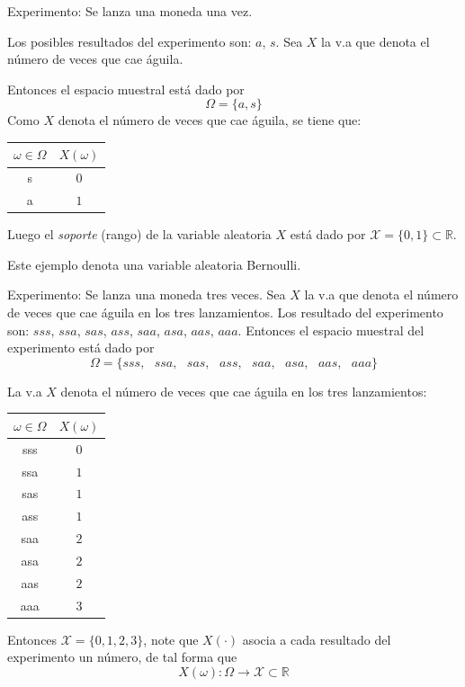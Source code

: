 \begin{example}
Experimento: Se lanza una moneda una vez. 
\vspace{5mm}

Los posibles resultados del experimento son: $a$, $s$. Sea $X$ la v.a que denota el número de veces que cae águila.

Entonces el espacio muestral está dado por
\begin{equation*}
\Omega =\{a,s\}
\end{equation*}
Como $X$ denota el número de veces que cae águila, se tiene que:
\begin{center}
\begin{tabular}{cc}
\hline
$\omega \in \Omega $ & $X(\omega )$ \\ 
\hline
s & $0$ \\ 
a & $1$ \\
\hline
\end{tabular}
\end{center}
Luego el \textit{soporte} (rango) de la variable aleatoria $X$ está dado por $\mathcal{X}=\{0,1\}\subset \mathbb{R}$.
\end{example}

\begin{remark}
Este ejemplo denota una variable aleatoria Bernoulli.
\end{remark}


\begin{example}
Experimento: Se lanza una moneda tres veces. Sea $X$ la v.a que denota el número de veces que cae águila en los tres lanzamientos.
Los resultado del experimento son: $sss$, $ssa$, $sas$, $ass$, $saa$, $asa$, $aas$, $aaa$. Entonces el espacio muestral del experimento está dado por
\begin{equation*}
\Omega =\{sss,\text{ }ssa,\text{ }sas,\text{ }ass,\text{ }saa,\text{ }asa,%
\text{ }aas,\text{ }aaa\}
\end{equation*}

La v.a $X$ denota el número de veces que cae águila en los tres lanzamientos:
\begin{center}
\begin{tabular}{cc}
\hline
$\omega \in \Omega $ & $X(\omega )$ \\
\hline
sss & $0$ \\ 
ssa & $1$ \\ 
sas & $1$ \\ 
ass & $1$ \\ 
saa & $2$ \\ 
asa & $2$ \\ 
aas & $2$ \\ 
aaa & $3$ \\
\hline
\end{tabular}
\end{center}

Entonces $\mathcal{X}=\{0,1,2,3\}$, note que $X(\cdot)$ asocia a cada resultado del experimento un número, de tal forma que
\begin{equation*}
X(\omega ):\Omega \rightarrow \mathcal{X}\subset \mathbb{R}
\end{equation*}
\end{example}



